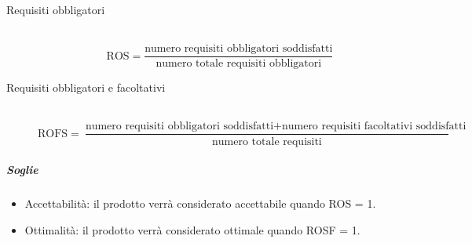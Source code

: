 \begin{description}
\item[Requisiti obbligatori]
	~\\ \begin{displaymath}
		\mbox{ROS}=\frac{\mbox{numero requisiti obbligatori soddisfatti}}{\mbox{numero totale requisiti obbligatori}}
	\end{displaymath}
	
\item[Requisiti obbligatori e facoltativi]
	~\\ \begin{displaymath}
		\mbox{ROFS}=\frac{\mbox{numero requisiti obbligatori soddisfatti} + \mbox{numero requisiti facoltativi soddisfatti}}{\mbox{numero totale requisiti}}
	\end{displaymath}
\end{description}

\subparagraph{Soglie}
\begin{itemize}
\item Accettabilità: il prodotto verrà considerato accettabile quando ROS = 1.
\item Ottimalità: il prodotto verrà considerato ottimale quando ROSF = 1.
\end{itemize}

\paragraph{}
